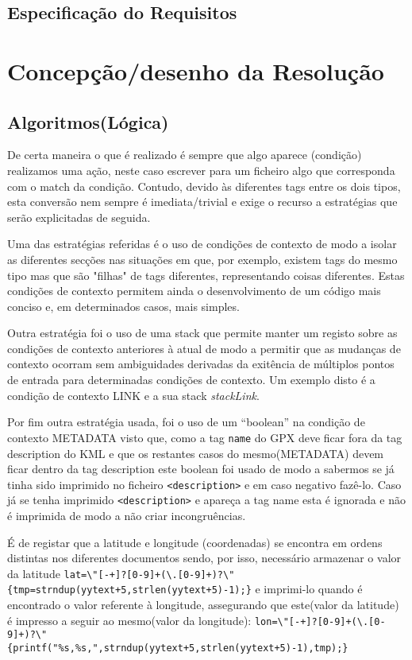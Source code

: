 \documentclass{llncs}
\begin{document}
\subsection{Especificação do Requisitos}

\section{Concepção/desenho da Resolução}
\subsection{Algoritmos(Lógica)}
De certa maneira o que é realizado é sempre que algo aparece (condição) realizamos uma ação, neste caso escrever para um ficheiro algo que corresponda com o match da condição. Contudo, devido às diferentes tags entre os dois tipos, esta conversão nem sempre é imediata/trivial e exige o recurso a estratégias que serão explicitadas de seguida.

Uma das estratégias referidas é o uso de condições de contexto de modo a isolar as diferentes secções nas situações em que, por exemplo, existem tags do mesmo tipo mas que são "filhas" de tags diferentes, representando coisas diferentes. Estas condições de contexto permitem ainda o desenvolvimento de um código mais conciso e, em determinados casos, mais simples.

Outra estratégia foi o uso de uma stack que permite manter um registo sobre as condições de contexto anteriores à atual de modo a permitir que as mudanças de contexto ocorram sem ambiguidades derivadas da exitência de múltiplos pontos de entrada para determinadas condições de contexto. Um exemplo disto é a condição de contexto LINK e a sua stack \textit{stackLink}.

Por fim outra estratégia usada, foi o uso de um ``boolean'' na condição de contexto METADATA visto que, como a tag \texttt{name} do GPX deve ficar fora da tag description do KML e que os restantes casos do mesmo(METADATA) devem ficar dentro da tag description este boolean foi usado de modo a sabermos se já tinha sido imprimido no ficheiro \verb|<description>| e em caso negativo fazê-lo. Caso já se tenha imprimido \verb|<description>| e apareça a tag name esta é ignorada e não é imprimida de modo a não criar incongruências.

É de registar que a latitude e longitude (coordenadas) se encontra em ordens distintas nos diferentes documentos sendo, por isso, necessário armazenar o valor da latitude
\verb|lat=\"[-+]?[0-9]+(\.[0-9]+)?\"                     {tmp=strndup(yytext+5,strlen(yytext+5)-1);}|
e imprimi-lo quando é encontrado o valor referente à longitude, assegurando que este(valor da latitude) é impresso a seguir ao mesmo(valor da longitude):
\verb|lon=\"[-+]?[0-9]+(\.[0-9]+)?\"                     {printf("%s,%s,",strndup(yytext+5,strlen(yytext+5)-1),tmp);}|
\end{document}
